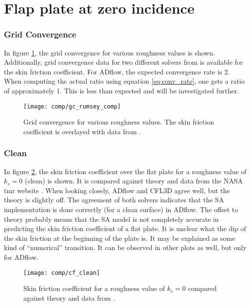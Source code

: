 \section{Flap plate at zero incidence}

\subsubsection{Grid Convergence}
In figure \ref{fig:gc_rumsey_comp}, the grid convergence for various roughness
values is shown.  Additionally, grid convergence data for two different solvers
from \cite{rumsey_flat} is available for the skin friction coefficient. For
ADflow, the expected convergence rate is 2. When computing the actual ratio using equation
\ref{eq:conv_rate}, one gets a ratio of approximately 1. This is less than
expected and will be investigated further.

\begin{figure}[H] \centering
  \texttt{[image: comp/gc\_rumsey\_comp]}
    \caption{Grid convergence for various roughness values. The skin friction
coefficient is overlayed with data from \cite{rumsey_flat}.}
    \label{fig:gc_rumsey_comp}
\end{figure}


\subsubsection{Clean}
In figure \ref{fig:cf_clean}, the skin friction coefficient over the flat plate
for a roughness value of $k_{s} = 0$ (clean) is shown. It is compared against
theory and data from the NASA tmr website \cite{rumsey_flat}. When looking
closely, ADflow and CFL3D agree well, but the theory is slightly off. The
agreement of both solvers indicates that the SA implementation is done correctly
(for a clean surface) in ADflow. The offset to theory probably means that the SA
model is not completely accurate in predicting the skin friction coefficient of
a flat plate.  It is unclear what the dip of the skin friction at the beginning
of the plate is. It may be explained as some kind of ``numerical'' transition. It
can be observed in other plots as well, but only for ADflow.

\begin{figure}[H] \centering
  \texttt{[image: comp/cf\_clean]}
    \caption{Skin friction coefficient for a roughness value of $k_{s} = 0$
      compared against theory and data from \cite{rumsey_flat}.}
    \label{fig:cf_clean}
\end{figure}


